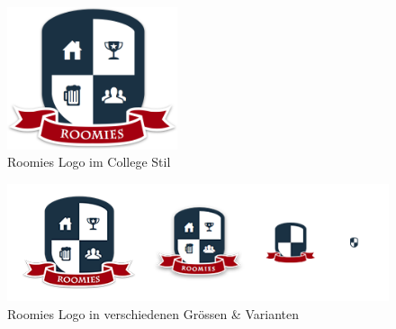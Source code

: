 \begin{figure}[H]
	\centering
	\includegraphics[width=5cm]{content/images/roomies-withshadow.png}
	\caption{Roomies Logo im College Stil}
\end{figure}

\begin{figure}[H]
	\centering
	\includegraphics[width=12cm]{content/images/logo-variants.png}
	\caption{Roomies Logo in verschiedenen Grössen \& Varianten}
\end{figure}